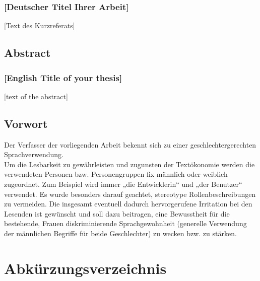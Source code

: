 \documentclass[a4paper,12pt,twoside]{scrreprt}
\begin{document}
\subsection*{[Deutscher Titel Ihrer Arbeit]}

[Text des Kurzreferats]

\newpage
\section*{Abstract}
\subsection*{[English Title of your thesis]}

[text of the abstract]

\newpage
\section*{Vorwort}

Der Verfasser der vorliegenden Arbeit bekennt sich zu einer geschlechtergerechten Sprachverwendung.\\
Um die Lesbarkeit zu gewährleisten und zugunsten der Textökonomie werden die verwendeten Personen bzw. Personengruppen fix männlich oder weiblich zugeordnet. Zum Beispiel wird immer „die Entwicklerin“ und „der Benutzer“ verwendet. Es wurde besonders darauf geachtet, stereotype Rollenbeschreibungen zu vermeiden. Die insgesamt eventuell dadurch hervorgerufene Irritation bei den Lesenden ist gewünscht und soll dazu beitragen, eine Bewusstheit für die bestehende, Frauen diskriminierende Sprachgewohnheit (generelle Verwendung der männlichen Begriffe für beide Geschlechter) zu wecken bzw. zu stärken. 

\cleardoublepage %
\tableofcontents

\clearpage
{}
{}
\listoffigures

\clearpage
{}
{}
\listoftables

\clearpage
{}
{}
\chapter*{Abkürzungsverzeichnis}
\begin{acronym}
\end{acronym}
\end{document}
